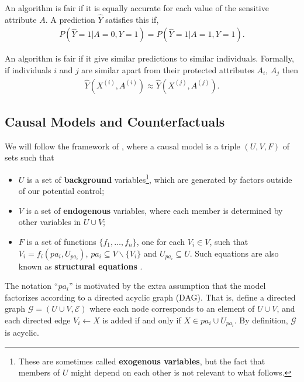 \begin{define}
An algorithm is fair if it is equally accurate for each value of the sensitive attribute $A$. A prediction $\hat{Y}$ satisfies this if,
\begin{align}
P(\hat{Y}=1 | A=0,Y=1) = P(\hat{Y}=1 | A=1,Y=1). \nonumber
\end{align}
\end{define}

\begin{define}
  An algorithm is fair if it give similar predictions to similar
  individuals. Formally, if individuals $i$ and $j$ are similar apart from their protected attributes $A_i$, $A_j$ then
\begin{align}
  \hat{Y}(X^{(i)}, A^{(i)}) \approx \hat{Y}(X^{(j)}, A^{(j)}).\nonumber
\end{align}
\end{define}


\subsection{Causal Models and Counterfactuals}
\label{subsec:cmc}
We will follow the framework of \citet{pearl:00}, where a causal
model is a triple $(U, V, F)$ of sets such that
\begin{itemize}
\item $U$ is a set of {\bf background} variables\footnote{These are
  sometimes called {\bf exogenous variables}, but the fact that members of $U$
  might depend on each other is not relevant to what follows.}, which are generated by factors
outside of our potential control;
\item $V$ is a set of {\bf endogenous} variables, where each member is determined by
  other variables in $U \cup V$;
\item $F$ is a set of functions $\{f_1, \dots, f_n\}$, one for each $V_i \in V$, such
that $V_i = f_i(pa_i, U_{pa_i})$, $pa_i \subseteq V \backslash
\{V_i\}$ and $U_{pa_i} \subseteq U$. Such equations are also known as
{\bf structural equations} \citep{bol:89}.
\end{itemize}

The notation ``$pa_i$'' is motivated by the extra assumption that the
model factorizes according to a directed acyclic graph (DAG). That is,
define a directed graph ${\mathcal G}=(U \cup V, \mathcal E )$ where each node corresponds to an
element of $U \cup V$, and each directed edge $V_i \leftarrow X$ is added if
and only if $X \in pa_i \cup U_{pa_i}$. By definition, $\mathcal G$ is
acyclic.

